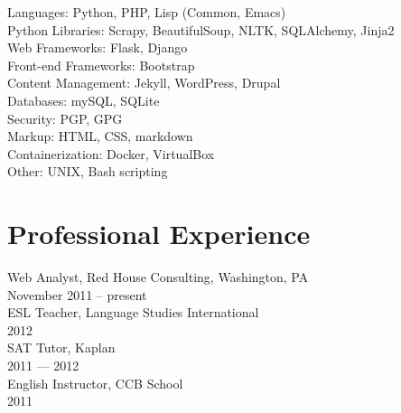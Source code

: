 \documentclass[11pt]{article}
\begin{document}
Languages: Python, PHP, Lisp (Common, Emacs)\\
Python Libraries: Scrapy, BeautifulSoup, NLTK, SQLAlchemy, Jinja2\\
Web Frameworks: Flask, Django\\
Front-end Frameworks: Bootstrap\\
Content Management: Jekyll, WordPress, Drupal\\
Databases: mySQL, SQLite\\
Security: PGP, GPG\\
Markup: HTML, CSS, markdown\\
Containerization: Docker, VirtualBox\\
Other: UNIX, Bash scripting\\
\section*{Professional Experience}
\label{sec:orgheadline12}

Web Analyst, Red House Consulting, Washington, PA\\
November 2011 – present\\

ESL Teacher, Language Studies International\\
2012\\

SAT Tutor, Kaplan\\
2011 — 2012\\

English Instructor, CCB School\\
2011\\
\end{document}
